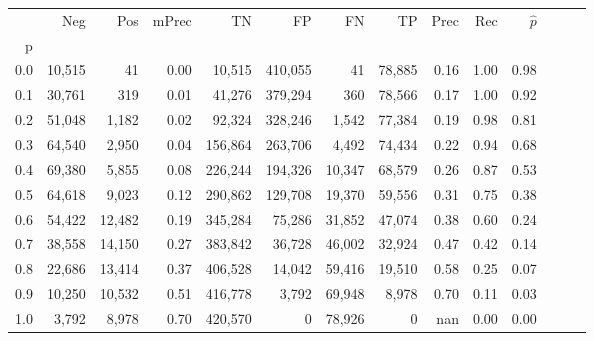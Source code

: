 \begin{tabular}{rrrrrrrrrrrrrr}
\toprule
{} &     Neg &     Pos & mPrec &       TN &       FP &      FN &      TP &  Prec &   Rec & $\hat{p}$ \\
p   &         &         &       &          &          &         &         &       &       &           \\
\midrule
0.0 &  10,515 &      41 &  0.00 &   10,515 &  410,055 &      41 &  78,885 &  0.16 &  1.00 &      0.98 \\
0.1 &  30,761 &     319 &  0.01 &   41,276 &  379,294 &     360 &  78,566 &  0.17 &  1.00 &      0.92 \\
0.2 &  51,048 &   1,182 &  0.02 &   92,324 &  328,246 &   1,542 &  77,384 &  0.19 &  0.98 &      0.81 \\
0.3 &  64,540 &   2,950 &  0.04 &  156,864 &  263,706 &   4,492 &  74,434 &  0.22 &  0.94 &      0.68 \\
0.4 &  69,380 &   5,855 &  0.08 &  226,244 &  194,326 &  10,347 &  68,579 &  0.26 &  0.87 &      0.53 \\
0.5 &  64,618 &   9,023 &  0.12 &  290,862 &  129,708 &  19,370 &  59,556 &  0.31 &  0.75 &      0.38 \\
0.6 &  54,422 &  12,482 &  0.19 &  345,284 &   75,286 &  31,852 &  47,074 &  0.38 &  0.60 &      0.24 \\
0.7 &  38,558 &  14,150 &  0.27 &  383,842 &   36,728 &  46,002 &  32,924 &  0.47 &  0.42 &      0.14 \\
0.8 &  22,686 &  13,414 &  0.37 &  406,528 &   14,042 &  59,416 &  19,510 &  0.58 &  0.25 &      0.07 \\
0.9 &  10,250 &  10,532 &  0.51 &  416,778 &    3,792 &  69,948 &   8,978 &  0.70 &  0.11 &      0.03 \\
1.0 &   3,792 &   8,978 &  0.70 &  420,570 &        0 &  78,926 &       0 &   nan &  0.00 &      0.00 \\
\bottomrule
\end{tabular}
